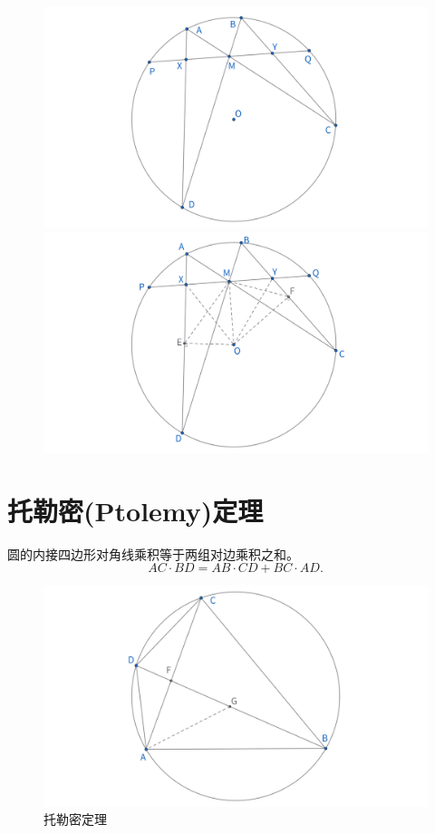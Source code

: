 \begin{figure}[H]
    \centering
    \hfill %
    \begin{minipage}[t]{0.45\textwidth}
    \centering
    \includegraphics[width=\linewidth]{figures/蝴蝶定理.png}
    \end{minipage}
    \hfill %
    \begin{minipage}[t]{0.45\textwidth}
    \centering
    \includegraphics[width=\linewidth]{figures/蝴蝶定理辅助线.png}
    \end{minipage}
\end{figure}


\newpage 
\section{托勒密(Ptolemy)定理}
\begin{theorem}
    圆的内接四边形对角线乘积等于两组对边乘积之和。
    $$AC \cdot BD = AB \cdot CD + BC \cdot AD.$$
\end{theorem}
\begin{figure}[H]
    \centering
    \includegraphics[width=0.7\linewidth]{figures/托勒密定理.png}
    \caption{托勒密定理}
\end{figure}
